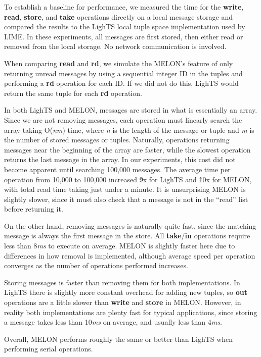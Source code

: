 To establish a baseline for performance, we measured the time for the \textbf{write}, \textbf{read}, \textbf{store}, and \textbf{take} operations directly on a local message storage and compared the results to the LighTS\cite{lights} local tuple space implementation used by LIME. In these experiments, all messages are first stored, then either read or removed from the local storage. No network communication is involved.

When comparing \textbf{read} and \textbf{rd}, we simulate the MELON's feature of only returning unread messages by using a sequential integer ID in the tuples and performing a \textbf{rd} operation for each ID. If we did not do this, LighTS would return the same tuple for each \textbf{rd} operation.

In both LighTS and MELON, messages are stored in what is essentially an array. Since we are not removing messages, each operation must linearly search the array taking O(\textit{nm}) time, where \textit{n} is the length of the message or tuple and \textit{m} is the number of stored messages or tuples. Naturally, operations returning messages near the beginning of the array are faster, while the slowest operation returns the last message in the array. In our experiments, this cost did not become apparent until searching 100,000 messages. The average time per operation from 10,000 to 100,000 increased \~9x for LighTS and \~10x for MELON, with total read time taking just under a minute. It is unsurprising MELON is slightly slower, since it must also check that a message is not in the ``read'' list before returning it.

On the other hand, removing messages is naturally quite fast, since the matching message is always the first message in the store. All \textbf{take}/\textbf{in} operations require less than 8\textit{ms} to execute on average. MELON is slightly faster here due to differences in how removal is implemented, although average speed per operation converges as the number of operations performed increases.

Storing messages is faster than removing them for both implementations. In LighTS there is slightly more constant overhead for adding new tuples, so \textbf{out} operations are a little slower than \textbf{write} and \textbf{store} in MELON.  However, in reality both implementations are plenty fast for typical applications, since storing a message takes less than 10\textit{ms} on average, and usually less than 4\textit{ms}.

Overall, MELON performs roughly the same or better than LighTS when performing serial operations.

